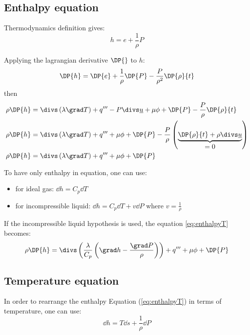 \subsection{Enthalpy equation}

Thermodynamics definition gives:
\begin{equation}
 h=e+ \dfrac{1}{\rho} P
\end{equation}

Applying the lagrangian derivative $\DP{}$ to $h$:
\begin{equation}
 \DP{h}=\DP{e}+\frac{1}{\rho}\DP{P}-\frac{P}{\rho^2}\DP{\rho}{t}
\end{equation}
%
then
\begin{align}
  \rho \DP{h} &= \divs \left( \lambda \grad T \right) +q'''-P\divs \underline{u} + \mu \phi + \DP{P} -\frac{P}{\rho}\DP{\rho}{t} \\
  \rho \DP{h} &= \divs \left( \lambda \grad T \right) +q''' + \mu \phi + \DP{P} - \frac{P}{\rho} \left(\underbrace{\DP{\rho}{t} + \rho \divs \underline{u}}_{\displaystyle =0} \right) \\
  \rho \DP{h} &= \divs \left( \lambda \grad T \right) +q''' + \mu \phi + \DP{P} 
\label{eq:enthalpyT}
\end{align}

To have only enthalpy in equation, one can use:
\begin{itemize}
 \item for ideal gas: $\displaystyle \dd h=C_p \dd T$
 \item for incompressible liquid: $\displaystyle \dd h=C_p \dd T + v \dd P$ where $\displaystyle v =\frac{1}{\rho}$
\end{itemize}

If the incompressible liquid hypothesis is used, the equation \ref{eq:enthalpyT} becomes:
\begin{equation}
 \rho \DP{h} = \divs \left( \dfrac{\lambda}{C_p} \left(\grad h -\frac{\grad P}{\rho}\right)\right) +q''' + \mu \phi + \DP{P} 
\label{eq:enthalpyH}
\end{equation}

\subsection{Temperature equation}

In order to rearrange the enthalpy Equation (\ref{eq:enthalpyT}) in terms of temperature, one can use:
\begin{equation}
 \dd h = T \dd s + \frac{1}{\rho} \dd P
\end{equation}

